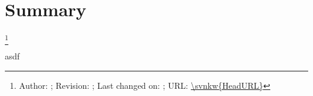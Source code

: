 \section{Summary}

\footnote{Author: \svnauthor; Revision: \svnrev; Last changed on: \svndate; URL: \url{\svnkw{HeadURL}}}

asdf
